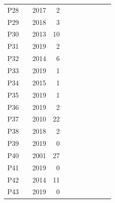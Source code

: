 \documentclass[manuscript,screen]{acmart}
\begin{document}
\begin{table}[]
\begin{tabular}{llrrccccccl}
P28   & \citet{birhanu2017keynvision}       & 2017 & 2          &                  &       &        &    &       & &        \\
P29   & \citet{sun2018mr}                   & 2018 & 3          &                  &       &        &    &    & &           \\
P30   & \citet{goodwin2013key}              & 2013 & 10         &                  &       &         &   &       & &        \\
P31   & \citet{zeng2019funpianoar}          & 2019 & 2          &                  &       &         &   &         & &      \\
P32   & \citet{de2014infrared}              & 2014 & 6          &                  &       &          &  &        & &       \\
P33   & \citet{molloy2019mixed}             & 2019 & 1          &                  &       &         &   &       & &        \\
P34   &  \citet{zaqout2015augmented}        & 2015 & 1          &                  &       &          &  &      & &         \\
P35   & \citet{cai2019design}               & 2019 & 1          &                  &       &         &   &     & &          \\
P36   & \citet{gerry2019adept}              & 2019 & 2          &                  &       &         &   &      & &         \\
P37   & \citet{zhang2010affordable}         & 2010 & 22         &                  &       &         &   &    & &           \\
P38   &  \citet{pan2018pilot}               & 2018 & 2          &                  &       &         &   &    & &           \\
P39   &  \citet{cai2019design}              & 2019 & 0          &                  &       &         &   &     & &          \\
P40   &  \citet{poupyrev2001augmented}      & 2001 & 27         &                  &       &         &   &     & &          \\
P41   & \citet{sandnes2019enhanced}         & 2019 & 0          &                  &       &         &   &    & &           \\
P42   & \citet{kim2014ar}                   & 2014 & 11         &                  &       &         &   &    & &           \\
P43   & \citet{zeng2019new}                 & 2019 & 0          &                  &       &        &    &    & &           \\

\end{tabular}
\end{table}
\end{document}
